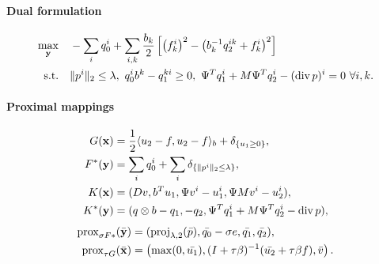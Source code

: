 \paragraph{Dual formulation}
\begin{align*}
    \max_{\mathbf{y}} \quad
        & -\sum_i q_0^i+ \sum_{i,k} \frac{b_k}{2} \left [
                \left(f_k^i\right)^2
                - \left(b_k^{-1} q_2^{ik} + f_k^i\right)^2
            \right ] \\
    \text{s.t.}\quad
        & \|p^{i}\|_{2} \leq \lambda,
          ~q_0^i b^k - q_1^{ki} \geq 0,
          ~\Psi^T q_1^i + M \Psi^T q_2^i - (\operatorname{div} p)^i = 0 ~\forall i,k.
\end{align*}

\paragraph{Proximal mappings}
\begin{align*}
    G(\mathbf{x}) &= \frac{1}{2} \langle u_2-f, u_2-f \rangle_b
        + \delta_{\{u_1 \geq 0\}}, \\
    F^*(\mathbf{y}) &= \sum_{i} q_0^i
        + \sum_{i} \delta_{\{\|p^{i}\|_{2} \leq \lambda\}}, \\
    K(\mathbf{x}) &= (
        Dv,
        b^T u_1,
        \Psi v^i - u_1^i,
        \Psi M v^i - u_2^i
    ), \\
    K^*(\mathbf{y}) &= (
        q \otimes b - q_1,
        -q_2,
        \Psi^T q_1^i + M \Psi^T q_2^i - \operatorname{div}{p}
    ),
\end{align*}
\begin{align*}
    \operatorname{prox}_{\sigma F*}(\bar{\mathbf{y}})
    &= (
        \operatorname{proj}_{\lambda,2}(\bar{p}),
        \bar{q_0}-\sigma e,
        \bar{q_1},
        \bar{q_2}
    ), \\
    \operatorname{prox}_{\tau G}(\bar{\mathbf{x}})
    &= \left(
        \max(0,\bar{u_1}),
        (I+\tau \beta)^{-1}(\bar{u_2} + \tau \beta f),
        \bar{v}
    \right).
\end{align*}
